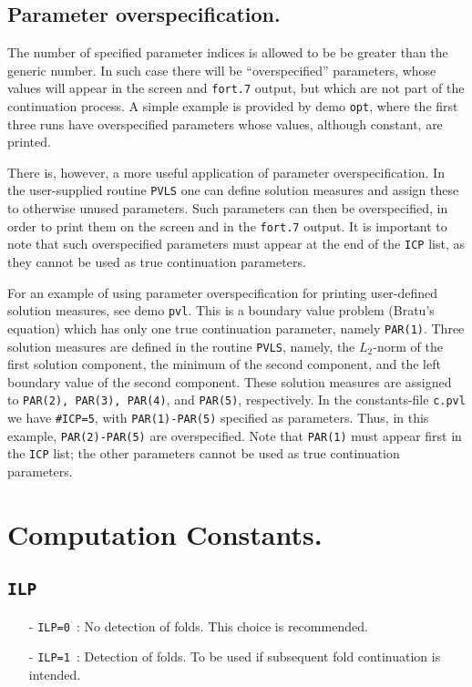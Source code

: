 \documentclass[12pt]{report}
\begin{document}
\subsection{ Parameter overspecification.} \label{sec:Parameter_over_specification}
The number of specified parameter indices is allowed to be be greater 
than the generic number.
In such case there will be ``overspecified'' parameters, whose values
will appear in the screen and {\tt fort.7} output, but which are not
part of the continuation process.
A simple example is provided by demo {\tt opt}, where the first three runs
have overspecified parameters whose values, although constant, are printed.

There is, however, a more useful application of parameter overspecification.
In the user-supplied routine {\tt PVLS} one can define solution measures
and assign these to otherwise unused parameters.
Such parameters can then be overspecified, in order to print them
on the screen and in the {\tt fort.7} output.
It is important to note that such overspecified parameters must appear
at the end of the {\tt ICP} list, as they cannot be used as true continuation
parameters.

For an example of using parameter overspecification for printing user-defined
solution measures, see demo {\tt pvl}.
This is a boundary value problem (Bratu's equation) which has
only one true continuation parameter, namely {\tt PAR(1)}.
Three solution measures are defined in the routine {\tt PVLS}, namely,
the $L_2$-norm of the first solution component,
the minimum of the second component, and
the left boundary value of the second component.
These solution measures are assigned to {\tt PAR(2), PAR(3), PAR(4)},
and {\tt PAR(5)}, respectively.
In the constants-file {\tt c.pvl} we have {\tt \#ICP=5},
with {\tt PAR(1)-PAR(5)} specified as parameters.
Thus, in this example, {\tt PAR(2)-PAR(5)} are overspecified.
Note that {\tt PAR(1)} must appear first in the {\tt ICP} list;
the other parameters cannot be used as true continuation parameters.
\section{ Computation Constants.} \label{sec:Computation_constants}
\subsection{\texttt{ILP}}  \label{sec:ILP}
\begin{itemize}
\item[-] {\tt ILP=0}~: 
  No detection of folds. This choice is recommended.
\item[-] {\tt ILP=1}~: 
  Detection of folds. To be used if subsequent fold continuation is intended.
\end{itemize}
\end{document}
